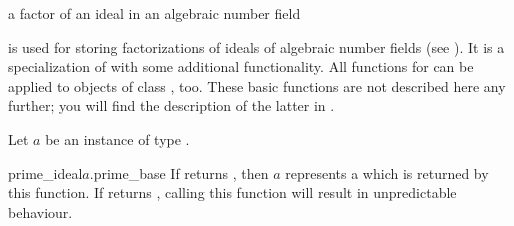 
\newcommand{\upperbound}{\mathit{upper\uscore bound}}
\newcommand{\lowerbound}{\mathit{lower\uscore bound}}
\newcommand{\fact}{\mathit{fact}}
\newcommand{\step}{\mathit{step}}



\NAME

 \dotfill a factor of an ideal in an
algebraic number field



\ABSTRACT

 is used for storing factorizations of ideals of algebraic
number fields (see ).  It is a specialization of 
with some additional functionality.  All functions for  can be applied
to objects of class , too.  These basic functions are not
described here any further; you will find the description of the latter in .



\DESCRIPTION





\ACCS

Let $a$ be an instance of type .

\begin{cfcode}{prime_ideal}{$a$.prime_base}{}
  If  returns \TRUE, then $a$ represents a  which
  is returned by this function.  If  returns \FALSE, calling this
  function will result in unpredictable behaviour.
\end{cfcode}


